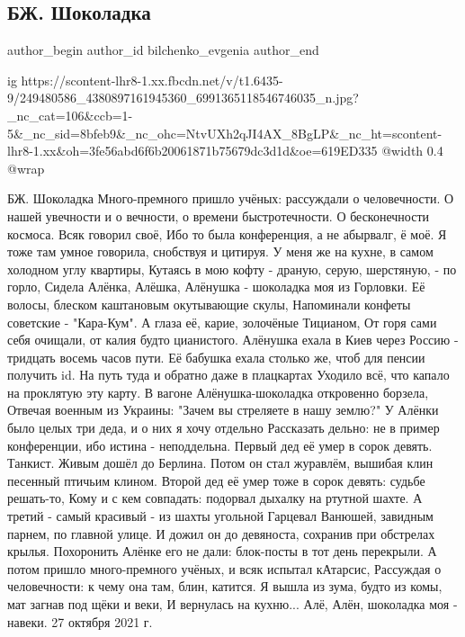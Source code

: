  
 
 
 
 
 
\subsection{БЖ. Шоколадка}
\label{sec:27_10_2021.fb.bilchenko_evgenia.1.shokoladka}
 
\ifcmt
 author_begin
   author_id bilchenko_evgenia
 author_end
\fi

\ifcmt
  ig https://scontent-lhr8-1.xx.fbcdn.net/v/t1.6435-9/249480586_4380897161945360_6991365118546746035_n.jpg?_nc_cat=106&ccb=1-5&_nc_sid=8bfeb9&_nc_ohc=NtvUXh2qJI4AX_8BgLP&_nc_ht=scontent-lhr8-1.xx&oh=3fe56abd6f6b20061871b75679dc3d1d&oe=619ED335
  @width 0.4
  @wrap 
\fi

БЖ. Шоколадка
Много-премного пришло учёных: рассуждали о человечности.
О нашей увечности и о вечности, о времени быстротечности.
О бесконечности космоса. Всяк говорил своё,
Ибо то была конференция, а не абырвалг, ё моё.
Я тоже там умное говорила, снобствуя и цитируя.
У меня же на кухне, в самом холодном углу квартиры,
Кутаясь в мою кофту - драную, серую, шерстяную, - по горло,
Сидела Алёнка, Алёшка, Алёнушка - шоколадка моя из Горловки.
Её волосы, блеском каштановым окутывающие скулы,
Напоминали конфеты советские - "Кара-Кум".
А глаза её, карие, золочёные Тицианом,
От горя сами себя очищали, от калия будто цианистого.
Алёнушка ехала в Киев через Россию - тридцать восемь часов пути.
Её бабушка ехала столько же, чтоб для пенсии получить id.
На путь туда и обратно даже в плацкартах 
Уходило всё, что капало на проклятую эту карту.
В вагоне Алёнушка-шоколадка откровенно борзела,
Отвечая военным из Украины: "Зачем вы стреляете в нашу землю?"
У Алёнки было целых три деда, и о них я хочу отдельно
Рассказать дельно: не в пример конференции, ибо истина - неподдельна.
Первый дед её умер в сорок девять. Танкист. Живым дошёл до Берлина.
Потом он стал журавлём, вышибая клин песенный птичьим клином.
Второй дед её умер тоже в сорок девять: судьбе решать-то,
Кому и с кем совпадать: подорвал дыхалку на ртутной шахте.
А третий - самый красивый - из шахты угольной
Гарцевал Ванюшей, завидным парнем, по главной улице.
И дожил он до девяноста, сохранив при обстрелах крылья.
Похоронить Алёнке его не дали: блок-посты в тот день перекрыли.
А потом пришло много-премного учёных, и всяк испытал кАтарсис,
Рассуждая о человечности: к чему она там, блин, катится.
Я вышла из зума, будто из комы, мат загнав под щёки и веки,
И вернулась на кухню... Алё, Алён, шоколадка моя - навеки.
27 октября 2021 г.
